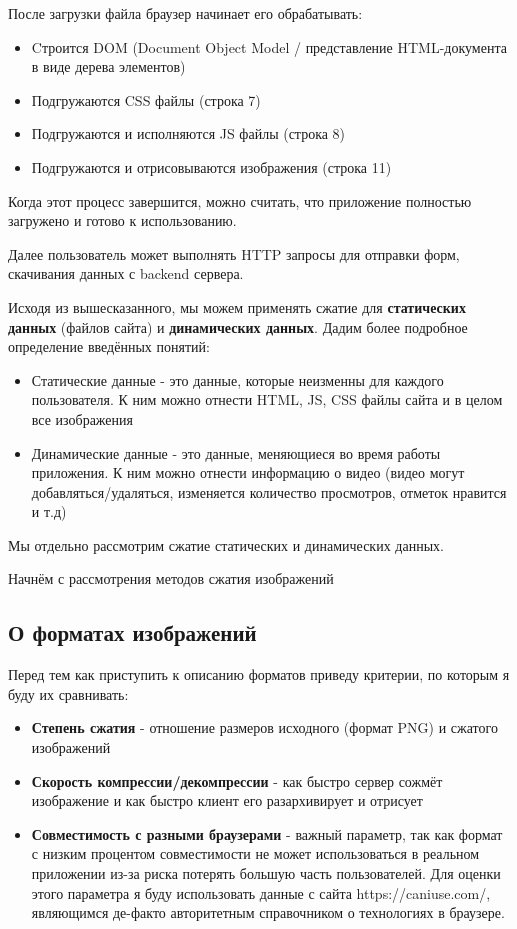 \documentclass[12pt]{article}
\begin{document}
После загрузки файла браузер начинает его обрабатывать:

\begin{itemize}
    \item Cтроится DOM (Document Object Model / представление HTML-документа в виде дерева элементов)
    \item Подгружаются CSS файлы (строка 7)
    \item Подгружаются и исполняются JS файлы (строка 8)
    \item Подгружаются и отрисовываются изображения (строка 11)
\end{itemize}

Когда этот процесс завершится, можно считать, что приложение полностью загружено и готово к использованию.

Далее пользователь может выполнять HTTP запросы для отправки форм, скачивания данных с backend сервера.

Исходя из вышесказанного, мы можем применять сжатие для \textbf{статических данных} (файлов сайта)
и \textbf{динамических данных}. Дадим более подробное определение введённых понятий:

\begin{itemize}
    \item Статические данные - это данные, которые неизменны для каждого пользователя. К ним можно отнести HTML, JS, CSS файлы сайта и в целом все изображения
    \item Динамические данные - это данные, меняющиеся во время работы приложения.
          К ним можно отнести информацию о видео (видео могут добавляться/удаляться, изменяется количество просмотров, отметок нравится и т.д)
\end{itemize}

Мы отдельно рассмотрим сжатие статических и динамических данных.

Начнём с рассмотрения методов сжатия изображений

\subsection{О форматах изображений}

Перед тем как приступить к описанию форматов приведу критерии, по которым я буду их сравнивать:

\begin{itemize}
    \item \textbf{Степень сжатия} - отношение размеров исходного (формат PNG) и сжатого изображений
    \item \textbf{Скорость компрессии/декомпрессии} - как быстро сервер сожмёт изображение и как быстро клиент его разархивирует и отрисует
    \item \textbf{Совместимость с разными браузерами} - важный параметр,
          так как формат с низким процентом совместимости не может использоваться в реальном приложении
          из-за риска потерять большую часть пользователей. Для оценки этого параметра
          я буду использовать данные с сайта https://caniuse.com/, являющимся де-факто авторитетным справочником
          о технологиях в браузере.
\end{itemize}
\end{document}
